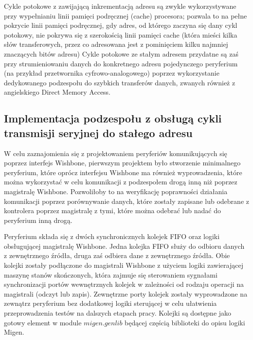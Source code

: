 Cykle potokowe z zawijającą inkrementacją adresu są zwykle wykorzystywane przy wypełnianiu linii pamięci podręcznej (cache) procesora; pozwala to na pełne pokrycie linii pamięci podręcznej, gdy adres, od którego zaczyna się dany cykl potokowy, nie pokrywa się z szerokością linii pamięci cache (która mieści kilka słów transferowych, przez co adresowana jest z pominięciem kilku najmniej znaczących bitów adresu)
Cykle potokowe ze stałym adresem przydatne są zaś przy strumieniowaniu danych do konkretnego adresu pojedynczego peryferium (na przykład przetwornika cyfrowo-analogowego) poprzez wykorzystanie dedykowanego podzespołu do szybkich transferów danych, zwanych również z angielskiego Direct Memory Access.

\subsection{Implementacja podzespołu z obsługą cykli transmisji seryjnej do stałego adresu}

W celu zaznajomienia się z projektowaniem peryferiów komunikujących się poprzez interfejs Wishbone, pierwszym projektem było stworzenie minimalnego peryferium, które oprócz interfejsu Wishbone ma również wyprowadzenia, które można wykorzystać w celu komunikacji z podzespołem drogą inną niż poprzez magistralę Wishbone. Pozwoliłoby to na weryfikację poprawności działania komunikacji poprzez porównywanie danych, które zostały zapisane lub odebrane z kontrolera poprzez magistralę z tymi, które można odebrać lub nadać do peryferium inną drogą.


Peryferium składa się z dwóch synchronicznych kolejek FIFO oraz logiki obsługującej magistralę Wishbone. Jedna kolejka FIFO służy do odbioru danych z zewnętrznego źródła, druga zaś odbiera dane z zewnętrznego źródła. Obie kolejki zostały podłączone do magistrali Wishbone z użyciem logiki zawierającej maszynę stanów skończonych, która zajmuje się sterowaniem sygnałami synchronizacji portów wewnętrznych kolejek w zależności od rodzaju operacji na magistrali (odczyt lub zapis). Zewnętrzne porty kolejek zostały wyprowadzone na zewnątrz peryferium bez dodatkowej logiki sterującej w celu ułatwienia przeprowadzenia testów na dalszych etapach pracy. Kolejki są dostępne jako gotowy element w module $migen.genlib$ będącej częścią biblioteki do opisu logiki Migen.


